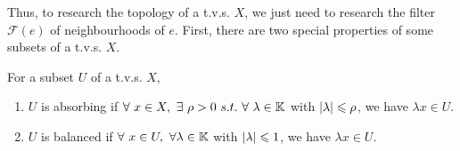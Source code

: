 \documentclass[a4paper,11pt]{report}
\begin{document}
Thus, to research the topology of a t.v.s. $X$, we just need to research the filter $\mathscr{F}(e)$ of neighbourhoods of $e$. First, there are two special properties of some subsets of a t.v.s. $X$.
\begin{defn}
	For a subset $U$ of a t.v.s. $X$, 
	\begin{enumerate}[label=\arabic*)]
		\item $U$ is absorbing if $\forall ~ x \in X,~ \exists ~ \rho > 0 ~s.t.~ \forall~ \lambda \in \mathbb{K}$ with $ \left\lvert\lambda\right\lvert \leqslant \rho$, we have $\lambda x \in U$.
		\item $U$ is balanced if $\forall ~ x \in U,~ \forall \lambda \in \mathbb{K}$ with $\left\lvert\lambda\right\lvert \leqslant 1$, we have $\lambda x \in U$.
	\end{enumerate}
\end{defn}
\end{document}
